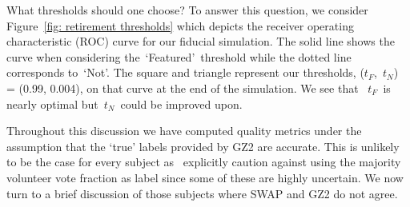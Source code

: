 \documentclass[twocolumn]{aastex6}
\newcommand\aastex{AAS\TeX}
\newcommand{\tf}{$t_F$}
\newcommand{\tn}{$t_N$}
\newcommand{\feat}{`Featured'}
\newcommand{\notfeat}{`Not'}
\begin{document}
What thresholds should one choose? To answer this question, we consider
Figure~\ref{fig: retirement thresholds} which depicts the receiver operating 
characteristic (ROC) curve for our fiducial simulation. The solid line shows the 
curve when considering the~\feat~threshold  while the dotted line
corresponds to~\notfeat. The square and triangle represent our thresholds, 
(\tf,~\tn) = (0.99, 0.004), on that curve at the end of the simulation.  We see that 
~\tf~is nearly optimal but~\tn~could be improved upon. 


Throughout this discussion we have computed quality metrics under the assumption
that the `true' labels provided by GZ2 are accurate. 
This is unlikely to be the case for every subject as~\cite{Willett2013} explicitly caution against using 
the majority volunteer vote fraction as label since some of these are highly uncertain. 
We now turn to a brief discussion of those subjects where SWAP and GZ2 do not agree. 












\listofchanges
\end{document}
